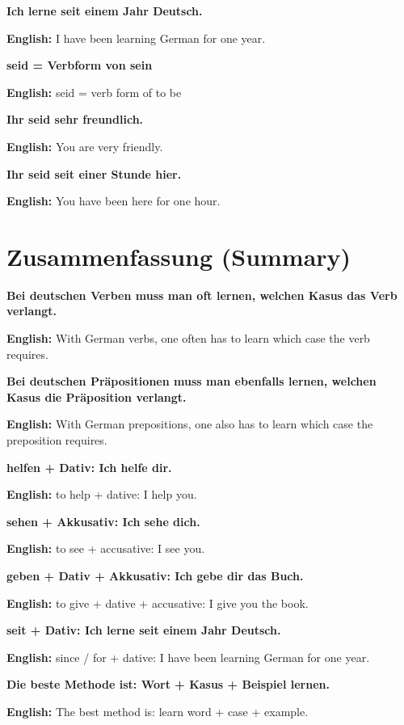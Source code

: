 \documentclass[a4paper,11pt]{article}
\newcommand{\EnglishText}[1]{{\small\color{SoftGray}\textbf{English: }#1\par}}
\newcommand{\EN}[1]{\EnglishText{#1}}
\begin{document}
            \textbf{Ich lerne seit einem Jahr Deutsch.}
            \EN{I have been learning German for one year.}
            
            \textbf{seid = Verbform von sein}
            \EN{seid = verb form of to be}
            
            \textbf{Ihr seid sehr freundlich.}
            \EN{You are very friendly.}
            
            \textbf{Ihr seid seit einer Stunde hier.}
            \EN{You have been here for one hour.}
    
    
    \section{Zusammenfassung \textnormal{(Summary)}}
        
        \textbf{Bei deutschen Verben muss man oft lernen, welchen Kasus das Verb verlangt.}
        \EN{With German verbs, one often has to learn which case the verb requires.}
        
        \textbf{Bei deutschen Präpositionen muss man ebenfalls lernen, welchen Kasus die Präposition verlangt.}
        \EN{With German prepositions, one also has to learn which case the preposition requires.}
        
        \textbf{helfen + Dativ: Ich helfe dir.}
        \EN{to help + dative: I help you.}
        
        \textbf{sehen + Akkusativ: Ich sehe dich.}
        \EN{to see + accusative: I see you.}
        
        \textbf{geben + Dativ + Akkusativ: Ich gebe dir das Buch.}
        \EN{to give + dative + accusative: I give you the book.}
        
        \textbf{seit + Dativ: Ich lerne seit einem Jahr Deutsch.}
        \EN{since / for + dative: I have been learning German for one year.}
        
        \textbf{Die beste Methode ist: Wort + Kasus + Beispiel lernen.}
        \EN{The best method is: learn word + case + example.}

%        
%        
\end{document}

